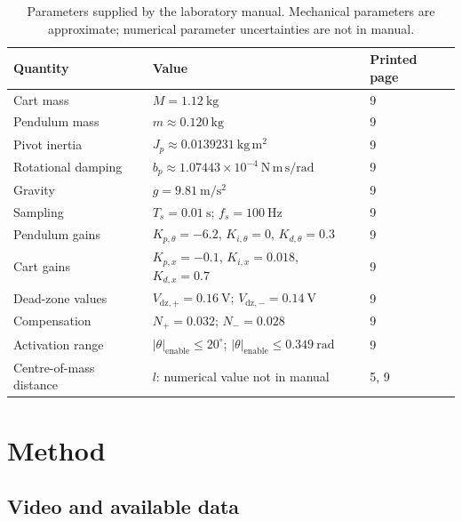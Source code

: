 \documentclass[11pt,a4paper]{article}
\newif\ifdraft
\DeclareRobustCommand{\guide}[1]{\ifdraft\par\smallskip\small\itshape Draft guidance: #1\par\smallskip\fi}
\newcommand{\manual}[1]{\cite[printed pp.~#1]{labmanual}}
\begin{document}
\begin{table}[htbp]
\centering\small
\caption{Parameters supplied by the laboratory manual. Mechanical parameters are approximate; numerical parameter uncertainties are not in manual.}
\label{tab:parameters}
\begin{tabularx}{\linewidth}{@{}lXl@{}}
\toprule
Quantity & Value & Printed page \\
\midrule
Cart mass & $M=1.12\ \mathrm{kg}$ & 9 \\
Pendulum mass & $m\approx0.120\ \mathrm{kg}$ & 9 \\
Pivot inertia & $J_p\approx0.0139231\ \mathrm{kg\,m^2}$ & 9 \\
Rotational damping & $b_p\approx1.07443\times10^{-4}\ \mathrm{N\,m\,s/rad}$ & 9 \\
Gravity & $g=9.81\ \mathrm{m/s^2}$ & 9 \\
Sampling & $T_s=0.01\ \mathrm{s}$; $f_s=100\ \mathrm{Hz}$ & 9 \\
Pendulum gains & $K_{p,\theta}=-6.2$, $K_{i,\theta}=0$, $K_{d,\theta}=0.3$ & 9 \\
Cart gains & $K_{p,x}=-0.1$, $K_{i,x}=0.018$, $K_{d,x}=0.7$ & 9 \\
Dead-zone values & $V_{\mathrm{dz},+}=0.16\ \mathrm{V}$; $V_{\mathrm{dz},-}=0.14\ \mathrm{V}$ & 9 \\
Compensation & $N_+=0.032$; $N_-=0.028$ & 9 \\
Activation range & $|\theta|_{\mathrm{enable}}\leq20^\circ$; $|\theta|_{\mathrm{enable}}\leq0.349\ \mathrm{rad}$ & 9 \\
Centre-of-mass distance & $l$: numerical value not in manual & 5, 9 \\
\bottomrule
\end{tabularx}
\end{table}
\guide{Refer to Table~\ref{tab:parameters} in the finished prose. Sources: \manual{8--9}. Cite the pendulum thesis as the principal technical reference once consulted \cite{pendulumthesis}. Gain units and the numerical cart reference are not in manual.}

\section{Method}
\label{sec:method}
\subsection{Video and available data}
\guide{Filename for analysed content: \texttt{"ELI2300\_Lab1Video"}, duration: \texttt{2:03.135} s, frame rate \texttt{29.97003} fps, playback tools: LosslessCut, Tracker.}
\end{document}
